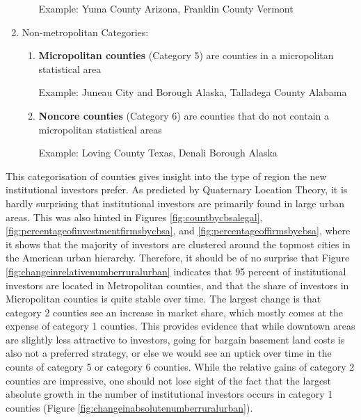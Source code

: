 \begin{enumerate}
\begin{enumerate}
		Example: Yuma County Arizona, Franklin County Vermont
		
	\end{enumerate}
	\item	Non-metropolitan Categories:
	\begin{enumerate}
		\item \textbf{Micropolitan counties} (Category 5) are counties in a micropolitan statistical area
		
		Example:  Juneau City and Borough Alaska, Talladega County Alabama
		
		\item \textbf{Noncore counties} (Category 6) are counties that do not contain a micropolitan statistical areas
		
		Example: Loving County Texas, Denali Borough Alaska
	\end{enumerate}
\end{enumerate}






This categorisation of counties gives insight into the type of region the new institutional investors prefer. As predicted by Quaternary Location Theory, it is hardly surprising that institutional investors are primarily found in large urban areas. This was also hinted in Figures \ref{fig:countbycbsalegal},  \ref{fig:percentageofinvestmentfirmsbycbsa}, and \ref{fig:percentageoffirmsbycbsa}, where it shows that the majority of investors are clustered around the topmost cities in the American urban hierarchy.  Therefore, it should be of no surprise that Figure \ref{fig:changeinrelativenumberruralurban} indicates that 95 percent of institutional investors are located in Metropolitan counties, and that the share of investors in Micropolitan counties is quite stable over time.  The largest change is that category 2 counties see an increase in market share, which mostly comes at the expense of category 1 counties. This provides evidence that while downtown areas are slightly less attractive to investors, going for bargain basement land costs is also not a preferred strategy, or else we would see an uptick over time in the counts of category 5 or category 6 counties.  While the relative gains of category 2 counties are impressive, one should not lose sight of the fact that the largest absolute growth in the number of institutional investors occurs in category 1 counties (Figure \ref{fig:changeinabsolutenumberruralurban}).     

